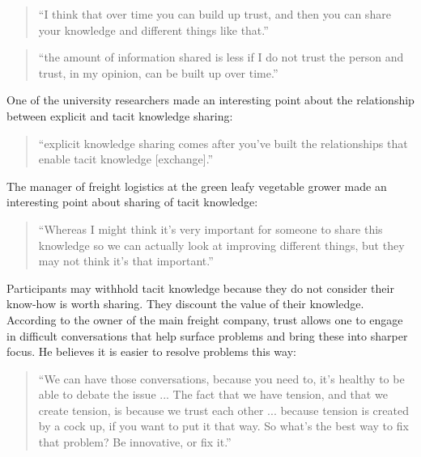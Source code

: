 \begin{quote}
\small
\enquote{I think that over time you can build up trust, and then you can share your knowledge and different things like that.} \\
\end{quote}

\begin{quote}
\small
\enquote{the amount of information shared is less if I do not trust the person and trust, in my opinion, can be built up over time.} \\
\end{quote}

One of the university researchers made an interesting point about the relationship between explicit and tacit knowledge sharing:

\begin{quote}
\small
\enquote{explicit knowledge sharing comes after you've built the relationships that enable tacit knowledge [exchange].} \\
\end{quote}

The manager of freight logistics at the green leafy vegetable grower made an interesting point about sharing of tacit knowledge:

\begin{quote}
\small
\enquote{Whereas I might think it's very important for someone to share this knowledge so we can actually look at improving different things, but they may not think it's that important.} \\
\end{quote}

Participants may withhold tacit knowledge because they do not consider their know-how is worth sharing. They discount the value of their knowledge. According to the owner of the main freight company, trust allows one to engage in difficult conversations that help surface problems and bring these into sharper focus. He believes it is easier to resolve problems this way:   

\begin{quote}
\small
\enquote{We can have those conversations, because you need to, it's healthy to be able to debate the issue ... The fact that we have tension, and that we create tension, is because we trust each other ... because tension is created by a cock up, if you want to put it that way. So what's the best way to fix that problem? Be innovative, or fix it.} \\
\end{quote}

